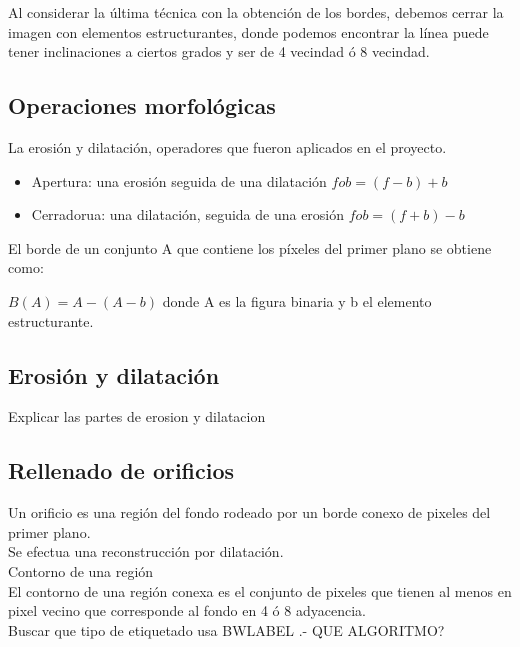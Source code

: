 \documentclass[a4paper, 11pt]{article}
\begin{document}
\begin{itemize}
\end{itemize}

Al considerar la última técnica con la obtención de los bordes, debemos cerrar la imagen con elementos estructurantes, donde podemos encontrar la línea puede tener inclinaciones a ciertos grados y ser de 4 vecindad ó 8 vecindad.\\

\subsection{Operaciones morfológicas}

La erosión y dilatación, operadores que fueron aplicados en el proyecto.

\begin{itemize}
\item Apertura: una erosión seguida de una dilatación $f o b = (f-b)+b$
\item Cerradorua: una dilatación, seguida de una erosión $f o b = (f+b)-b$
\end{itemize}

El borde de un conjunto A que contiene los píxeles del primer plano se obtiene como:

$B(A)=A-(A-b)$ donde A es la figura binaria y b el elemento estructurante.

\subsection{Erosión y dilatación}

Explicar las partes de erosion y dilatacion

\subsection{Rellenado de orificios}

Un orificio es una región del fondo rodeado por un borde conexo de pixeles del primer plano.\\

Se efectua una reconstrucción por dilatación.\\

Contorno de una región\\

El contorno de una región conexa es el conjunto de pixeles que tienen al menos en pixel vecino que corresponde al fondo en 4 ó 8 adyacencia.\\


Buscar que tipo de etiquetado usa BWLABEL .- QUE ALGORITMO?\\
\end{document}

